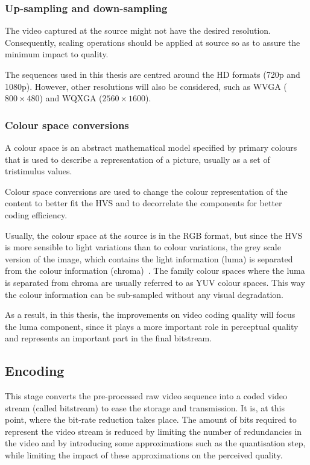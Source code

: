 \documentclass[11pt,a4paper,openright,twoside]{book}
\numberwithin{equation}{section} %
\numberwithin{figure}{section} %
\numberwithin{table}{section} %
\begin{document}
\subsubsection{Up-sampling and down-sampling}
\label{ssub:up-sampling_and_down-sampling}

The video captured at the source might not have the desired resolution.
Consequently, scaling operations should be applied at source so as to assure
the minimum impact to quality.

The sequences used in this thesis are centred around the \ac{HD} formats (720p
and 1080p).
However, other resolutions will also be considered, such as WVGA
($800\times480$) and WQXGA ($2560\times1600$).

\subsubsection{Colour space conversions}
\label{ssub:colour_space_conversions}

A colour space is an abstract mathematical model specified by primary colours
that is used to describe a representation of a picture, usually as a set of
tristimulus values.

Colour space conversions are used to change the colour representation of the
content to better fit the \ac{HVS} and to decorrelate the components for
better coding efficiency.

Usually, the colour space at the source is in the \ac{RGB} format, but
since the \ac{HVS} is more sensible to light variations than to colour
variations, the grey scale version of the image, which contains the light
information (luma) is separated from the colour information
(chroma)~\cite{poynton-95-color-space}.
The family colour spaces where the luma is separated from chroma are usually
referred to as YUV colour spaces.
This way the colour information can be sub-sampled without any visual
degradation.

As a result, in this thesis, the improvements on video coding quality will
focus the luma component, since it plays a more important role in perceptual
quality and represents an important part in the final bitstream.

\subsection{Encoding}
\label{sub:encoding}

This stage converts the pre-processed raw video sequence into a coded video
stream (called bitstream) to ease the storage and transmission.
It is, at this point, where the bit-rate reduction takes place.
The amount of bits required to represent the video stream is reduced by
limiting the number of redundancies in the video and by introducing some
approximations such as the quantisation step, while limiting the impact of
these approximations on the perceived quality.
\end{document}
